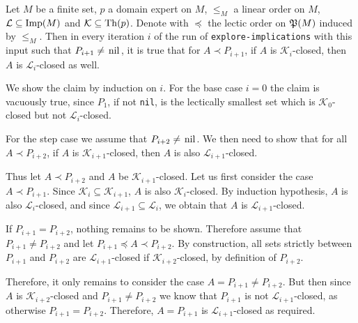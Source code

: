 \begin{Proposition}
  \label{prop:explore-implications-closedness-persists}
  Let $M$ be a finite set, $p$ a domain expert on $M$, $\leq_M$ a linear order on $M$,
  $\mathcal{L} \subseteq \operatorname{Imp}(M)$ and $\mathcal{K} \subseteq \operatorname{Th}(p)$.  Denote with
  $\preceq$ the lectic order on ${\mathfrak{P}(M)}$ induced by $\leq_M$.  Then in every iteration
  $i$ of the run of \lstinline{explore-implications} with this input such that $P_{i+1}
  \neq \text{\lstinline{nil}}$, it is true that for $A \prec P_{i+1}$, if $A$ is
  $\mathcal{K}_i$-closed, then $A$ is $\mathcal{L}_i$-closed as well.
\end{Proposition}
\begin{Proof}
  We show the claim by induction on $i$.  For the base case $i = 0$ the claim is vacuously
  true, since $P_1$, if not \lstinline{nil}, is the lectically smallest set which is
  $\mathcal{K}_0$-closed but not $\mathcal{L}_i$-closed.

  For the step case we assume that $P_{i+2} \neq \text{\lstinline{nil}}$.  We then need to
  show that for all $A \prec P_{i+2}$, if $A$ is $\mathcal{K}_{i+1}$-closed, then $A$ is
  also $\mathcal{L}_{i+1}$-closed.

  Thus let $A \prec P_{i+2}$ and $A$ be $\mathcal{K}_{i+1}$-closed.  Let us first consider
  the case $A \prec P_{i+1}$.  Since $\mathcal{K}_i \subseteq \mathcal{K}_{i+1}$, $A$ is
  also $\mathcal{K}_i$-closed.  By induction hypothesis, $A$ is also
  $\mathcal{L}_i$-closed, and since $\mathcal{L}_{i+1} \subseteq \mathcal{L}_i$, we obtain
  that $A$ is $\mathcal{L}_{i+1}$-closed.

  If $P_{i+1} = P_{i+2}$, nothing remains to be shown.  Therefore assume that $P_{i+1}
  \neq P_{i+2}$ and let $P_{i+1} \preceq A \prec P_{i+2}$.  By construction, all sets
  strictly between $P_{i+1}$ and $P_{i+2}$ are $\mathcal{L}_{i+1}$-closed if
  $\mathcal{K}_{i+2}$-closed, by definition of $P_{i+2}$.

  Therefore, it only remains to consider the case $A = P_{i+1} \neq P_{i+2}$.  But then
  since $A$ is $\mathcal{K}_{i+2}$-closed and $P_{i+1} \neq P_{i+2}$ we know that
  $P_{i+1}$ is not $\mathcal{L}_{i+1}$-closed, as otherwise $P_{i+1} = P_{i+2}$.
  Therefore, $A = P_{i+1}$ is $\mathcal{L}_{i+1}$-closed as required.
\end{Proof}

